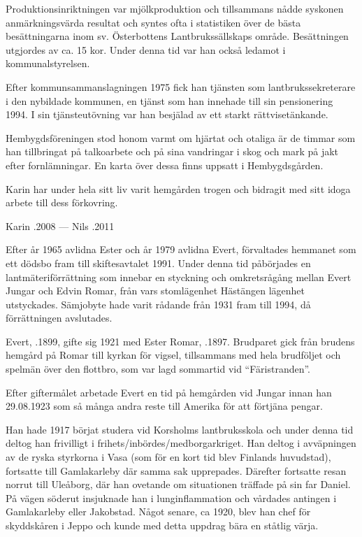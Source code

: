 Produktionsinriktningen var mjölkproduktion och tillsammans nådde syskonen anmärkningsvärda resultat och syntes ofta i statistiken över de bästa besättningarna inom sv. Österbottens Lantbrukssällskaps område. Besättningen utgjordes av ca. 15 kor. Under denna tid var han också ledamot i kommunalstyrelsen.

Efter kommunsammanslagningen 1975 fick han tjänsten som lantbrukssekreterare i den nybildade kommunen, en tjänst som han innehade till sin pensionering 1994. I sin tjänsteutövning var han besjälad av ett starkt rättvisetänkande.

Hembygdsföreningen stod honom varmt om hjärtat och otaliga är de timmar som han tillbringat på talkoarbete och på sina vandringar i skog och mark på jakt efter fornlämningar. En karta över dessa finns uppsatt i Hembygdsgården.

Karin har under hela sitt liv varit hemgården trogen och bidragit med sitt idoga arbete till dess förkovring.

Karin .2008  ---  Nils .2011


Efter år 1965 avlidna Ester och år 1979 avlidna Evert, förvaltades hemmanet som ett dödsbo fram till skiftesavtalet 1991. Under denna tid påbörjades en lantmäteriförrättning som innebar en styckning och omkretsrågång mellan Evert Jungar och Edvin Romar, från vars stomlägenhet Hästängen lägenhet utstyckades. Sämjobyte hade varit rådande från 1931 fram till 1994, då förrättningen avslutades.



Evert, .1899, gifte sig 1921 med Ester Romar, .1897. Brudparet gick från brudens hemgård på Romar till kyrkan för vigsel, tillsammans med hela brudföljet och spelmän över den flottbro, som var lagd sommartid vid ``Färistranden''.


Efter giftermålet arbetade Evert en tid på hemgården vid Jungar innan han 29.08.1923 som så många andra reste till Amerika för att förtjäna pengar.

Han hade 1917 börjat studera vid Korsholms lantbruksskola och under denna tid deltog han frivilligt i frihets/inbördes/medborgarkriget. Han deltog i avväpningen av de ryska styrkorna i Vasa (som för en kort tid blev Finlands huvudstad), fortsatte till Gamlakarleby där samma sak upprepades. Därefter fortsatte resan norrut till Uleåborg, där han ovetande om situationen träffade på sin far Daniel. På vägen söderut insjuknade han i lunginflammation och vårdades antingen i Gamlakarleby eller Jakobstad. Något senare, ca 1920, blev han chef för skyddskåren i Jeppo och kunde med detta uppdrag bära en ståtlig värja.


